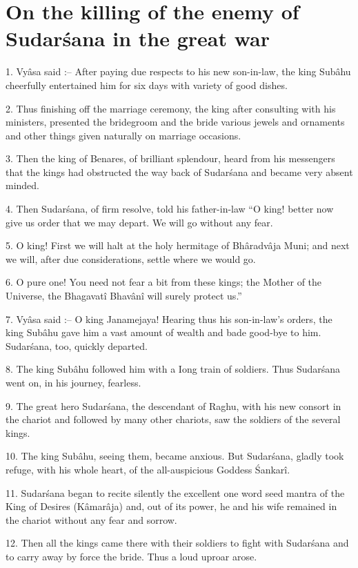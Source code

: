 ﻿\chapter{On the killing of the enemy of Sudar\'sana in the great war}

1. Vy\^asa said :-- After paying due respects to his new son-in-law, the king Sub\^ahu cheerfully entertained him for six days with variety of good dishes.

2. Thus finishing off the marriage ceremony, the king after consulting with his ministers, presented the bridegroom and the bride various jewels and ornaments and other things given naturally on marriage occasions.

3. Then the king of Benares, of brilliant splendour, heard from his messengers that the kings had obstructed the way back of Sudar\'sana and became very absent minded.

4. Then Sudar\'sana, of firm resolve, told his father-in-law ``O king! better now give us order that we may depart. We will go without any fear.

5. O king! First we will halt at the holy hermitage of Bh\^aradv\^aja Muni; and next we will, after due considerations, settle where we would go.

6. O pure one! You need not fear a bit from these kings; the Mother of the Universe, the Bhagavat\^i Bhav\^an\^i will surely protect us.''

7. Vy\^asa said :-- O king Janamejaya! Hearing thus his son-in-law's orders, the king Sub\^ahu gave him a vast amount of wealth and bade good-bye to him. Sudar\'sana, too, quickly departed.

8. The king Sub\^ahu followed him with a Iong train of soldiers. Thus Sudar\'sana went on, in his journey, fearless.

9. The great hero Sudar\'sana, the descendant of Raghu, with his new consort in the chariot and followed by many other chariots, saw the soldiers of the several kings.

10. The king Sub\^ahu, seeing them, became anxious. But Sudar\'sana, gladly took refuge, with his whole heart, of the all-auspicious Goddess \'Sankar\^i.

11. Sudar\'sana began to recite silently the excellent one word seed mantra of the King of Desires (K\^amar\^aja) and, out of its power, he and his wife remained in the chariot without any fear and sorrow.

12. Then all the kings came there with their soldiers to fight with Sudar\'sana and to carry away by force the bride. Thus a loud uproar arose.

